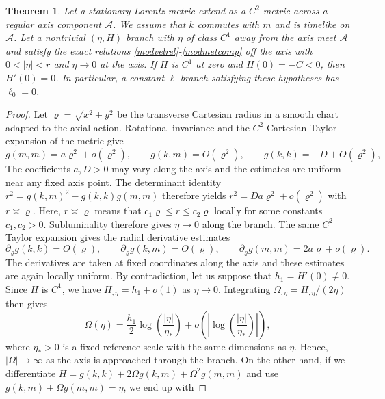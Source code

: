 \documentclass[amsmath,amsfonts,amssymb,aps,pra,superscriptaddress,10pt]{revtex4-2}
\numberwithin{equation}{section}
\theoremstyle{plain}
\newtheorem{theorem}{Theorem}
\theoremstyle{definition}
\theoremstyle{remark}
\theoremstyle{definition}
\newcommand{\ellzero}{\ell_0}
\begin{document}
\begin{theorem}\label{axisjetconstr}
Let a stationary Lorentz metric extend as a $C^2$ metric across a regular
axis component $\mathcal{A}$. We assume that $k$ commutes with $m$ and is
timelike on $\mathcal{A}$. Let a nontrivial $(\eta,H)$ branch with $\eta$ of class $C^1$ away from the axis meet $\mathcal{A}$ and satisfy the exact relations \eqref{modvelrel}-\eqref{modmetcomp} off the axis with $0<|\eta|<r$ and $\eta\to 0$ at the axis. If $H$ is $C^1$ at zero and $H(0)=-C<0$, then $H'(0)=0$. In particular, a constant-$\ell$ branch satisfying these hypotheses has $\ellzero=0$.
\end{theorem}

\begin{proof}
Let $\varrho=\sqrt{x^2+y^2}$ be the transverse Cartesian radius in a smooth chart adapted to the axial action. Rotational invariance and the $C^2$ Cartesian Taylor expansion of the metric give
\begin{equation}\label{maxj}
g(m,m)=a\varrho^2+o(\varrho^2),\qquad
g(k,m)=O(\varrho^2),\qquad
g(k,k)=-D+O(\varrho^2),
\end{equation}
The coefficients $a,D>0$ may vary along the axis and the estimates are uniform near any fixed axis point. The determinant identity $r^2=g(k,m)^2-g(k,k)g(m,m)$ therefore yields $r^2=Da\varrho^2+o(\varrho^2)$ with $r\asymp\varrho$. Here, $r\asymp\varrho$ means that $c_1\varrho\leq r\leq c_2\varrho$ locally for some constants $c_1,c_2>0$. Subluminality therefore gives $\eta\to 0$ along the branch. The same $C^2$ Taylor expansion gives the radial derivative estimates
\begin{equation}\label{metricaxderjets}
\partial_\varrho g(k,k)=O(\varrho),\qquad
\partial_\varrho g(k,m)=O(\varrho),\qquad
\partial_\varrho g(m,m)=2a\varrho+o(\varrho).
\end{equation}
The derivatives are taken at fixed coordinates along the axis and these estimates are again locally uniform. By contradiction, let us suppose that $h_1=H'(0)\neq 0$. Since $H$ is $C^1$, we have $H_{,\eta}=h_1+o(1)$ as $\eta\to 0$. Integrating $\Omega_{,\eta}=H_{,\eta}/(2\eta)$ then gives
\begin{equation}
\Omega(\eta)=\frac{h_1}{2}\log{\left(\frac{|\eta|}{\eta_*}\right)}
+o\left(\left|\log{\left(\frac{|\eta|}{\eta_*}\right)}\right|\right),
\end{equation}
where $\eta_*>0$ is a fixed reference scale with the same dimensions as $\eta$. Hence, $|\Omega|\to\infty$ as the axis is approached through the branch. On the other hand, if we differentiate $H=g(k,k)+2\Omega g(k,m)+\Omega^2 g(m,m)$ and use $g(k,m)+\Omega g(m,m)=\eta$, we end up with 

\end{proof}
\end{document}
